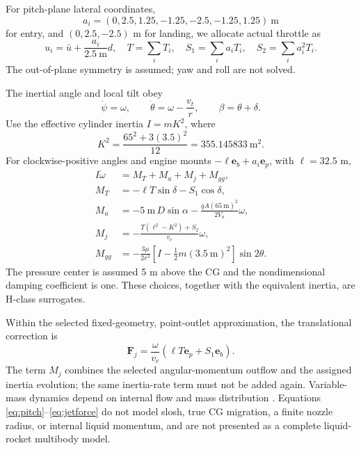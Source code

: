 \documentclass[11pt,a4paper]{article}
\newcommand{\vect}[1]{\bm{#1}}
\newcommand{\eb}{\vect e_b}
\newcommand{\ep}{\vect e_p}
\begin{document}
For pitch-plane lateral coordinates,
\begin{equation}
 a_i=(0,2.5,1.25,-1.25,-2.5,-1.25,1.25)\ \mathrm{m}
\end{equation}
for entry, and $(0,2.5,-2.5)$ m for landing, we allocate actual throttle as
\begin{equation}
 u_i=\bar u+\frac{a_i}{2.5\ \mathrm{m}}d,
 \quad T=\sum_iT_i,\quad S_1=\sum_i a_iT_i,\quad S_2=\sum_i a_i^2T_i.
\label{eq:allocation}
\end{equation}
The out-of-plane symmetry is assumed; yaw and roll are not solved.

The inertial angle and local tilt obey
\begin{equation}
 \dot\psi=\omega,\qquad \dot\theta=\omega-\frac{v_t}{r},
 \qquad \beta=\theta+\delta.
\end{equation}
Use the effective cylinder inertia $I=mK^2$, where
\begin{equation}
 K^2=\frac{65^2+3(3.5)^2}{12}=355.145833\ \mathrm{m}^2.
\end{equation}
For clockwise-positive angles and engine mounts $-\ell\eb+a_i\ep$, with $\ell=32.5$ m,
\begin{align}
 I\dot\omega&=M_T+M_a+M_j+M_{gg},\\
 M_T&=-\ell T\sin\delta-S_1\cos\delta,\\
 M_a&=-5\ \mathrm{m}\,D\sin\alpha
       -\frac{qA(65\ \mathrm{m})^2}{2V_a}\omega,\\
 M_j&=-\frac{T(\ell^2-K^2)+S_2}{v_e}\omega,\\
 M_{gg}&=-\frac{3\mu}{2r^3}\left[I-\tfrac12m(3.5\ \mathrm{m})^2\right]\sin2\theta.
\label{eq:pitch}
\end{align}
The pressure center is assumed 5 m above the CG and the nondimensional damping coefficient is one. These choices, together with the equivalent inertia, are H-class surrogates.

Within the selected fixed-geometry, point-outlet approximation, the translational correction is
\begin{equation}
 \vect F_j=\frac{\omega}{v_e}\left(\ell T\ep+S_1\eb\right).
\label{eq:jetforce}
\end{equation}
The term $M_j$ combines the selected angular-momentum outflow and the assigned inertia evolution; the same inertia-rate term must not be added again. Variable-mass dynamics depend on internal flow and mass distribution \cite{variablemass}. Equations \eqref{eq:pitch}--\eqref{eq:jetforce} do not model slosh, true CG migration, a finite nozzle radius, or internal liquid momentum, and are not presented as a complete liquid-rocket multibody model.
\end{document}
